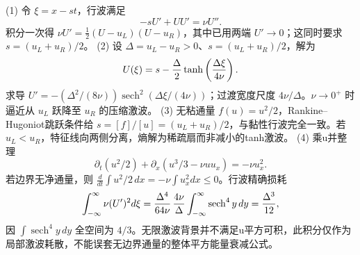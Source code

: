 (1) 令 \(\xi=x-st\)，行波满足
\[
-sU'+UU'=\nu U''.
\]
积分一次得 \(\nu U'=\tfrac12(U-u_L)(U-u_R)\)，其中已用两端 \(U'\to0\)；这同时要求 \(s=(u_L+u_R)/2\)。
(2) 设 \(\Delta=u_L-u_R>0\)、\(s=(u_L+u_R)/2\)，解为
\[
U(\xi)=s-{\Delta\over2}\tanh\left({\Delta\xi\over4\nu}\right).
\]
求导 \(U'=-(\Delta^2/(8\nu))\operatorname{sech}^2(\Delta\xi/(4\nu))\)；过渡宽度尺度 \(4\nu/\Delta\)。\(\nu\to0^+\) 时逼近从 \(u_L\) 跃降至 \(u_R\) 的压缩激波。
(3) 无粘通量 \(f(u)=u^2/2\)，Rankine–Hugoniot跳跃条件给
\(s=[f]/[u]=(u_L+u_R)/2\)，与黏性行波完全一致。若 \(u_L<u_R\)，特征线向两侧分离，熵解为稀疏扇而非减小的tanh激波。
(4) 乘u并整理
\[
\partial_t(u^2/2)+\partial_x(u^3/3-\nu uu_x)=-\nu u_x^2.
\]
若边界无净通量，则 \(\frac d{dt}\int u^2/2\,dx=-\nu\int u_x^2dx\le0\)。行波精确损耗
\[
\int_{-\infty}^{\infty}\nu(U')^2d\xi
={\Delta^4\over64\nu}\,{4\nu\over\Delta}\int_{-\infty}^\infty\operatorname{sech}^4y\,dy
={\Delta^3\over12},
\]
因 \(\int\operatorname{sech}^4y\,dy\) 全空间为 \(4/3\)。无限激波背景并不满足u平方可积，此积分仅作为局部激波耗散，不能误套无边界通量的整体平方能量衰减公式。

